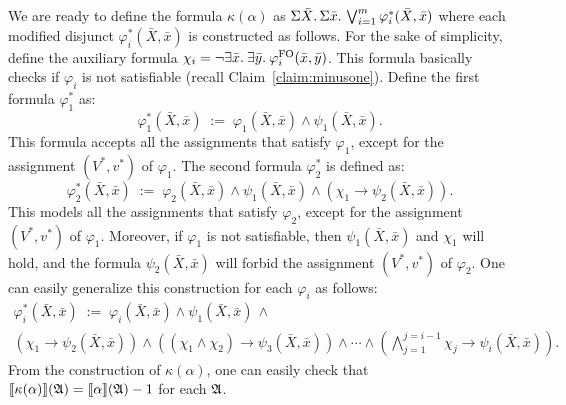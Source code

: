 We are ready to define the formula  $\kappa(\alpha)$ as $\Sigma{\bar{X}}.\,\Sigma{\bar{x}}.\, \bigvee_{i = 1}^m\varphi_i^*(\bar{X},\bar{x})$
where each modified disjunct $\varphi_i^*(\bar{X},\bar{x})$ is constructed as follows. 
For the sake of simplicity, define the auxiliary formula $\chi_i = \neg \exists{\bar{x}}.\: \exists{\bar{y}}.\:\varphi^{{\rm FO}}_i(\bar{x},\bar{y})$. 
This formula basically checks if $\varphi_i$ is not satisfiable (recall Claim~\ref{claim:minusone}).
Define the first formula $\varphi_1^*$ as:
\[
\varphi^*_1(\bar{X},\bar{x}) \; := \; \varphi_1(\bar{X},\bar{x})\wedge\psi_1(\bar{X},\bar{x}).
\]
This formula accepts all the assignments that satisfy $\varphi_1$, except for the assignment $(V^*,v^*)$ of $\varphi_1$. The second formula $\varphi_2^*$ is defined as:
\[
\varphi^*_2(\bar{X},\bar{x}) \; := \; \varphi_2(\bar{X},\bar{x})\wedge\psi_1(\bar{X},\bar{x})\wedge(\chi_1\to\psi_2(\bar{X},\bar{x})).
\]
This models all the assignments that satisfy $\varphi_2$, except for the assignment $(V^*,v^*)$ of $\varphi_1$. Moreover, if $\varphi_1$ is not satisfiable, then $\psi_1(\bar{X},\bar{x})$ and $\chi_1$ will hold, and the formula $\psi_2(\bar{X},\bar{x})$ will forbid the assignment $(V^*,v^*)$ of $\varphi_2$. 
One can easily generalize this construction for each $\varphi_i$ as follows:
\begin{multline*}
\varphi_i^*(\bar{X},\bar{x}) \; := \; \varphi_i(\bar{X},\bar{x})\wedge\psi_1(\bar{X},\bar{x})\,\wedge \\ (\chi_1\to\psi_2(\bar{X},\bar{x}))\wedge((\chi_1\wedge\chi_2)\to\psi_3(\bar{X},\bar{x}))\wedge\cdots\wedge(
\bigwedge_{j = 1}^{j = i-1}\chi_j\to\psi_i(\bar{X},\bar{x})).
\end{multline*}
From the construction of $\kappa(\alpha)$, one can easily check that  ${\llbracket{}{\kappa(\alpha)}\rrbracket}(\mathfrak{A}) = {\llbracket{}{\alpha}\rrbracket}(\mathfrak{A})-1$ for each $\mathfrak{A}$.

\medskip

